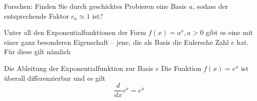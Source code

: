 \begin{enumerate}
          Forschen: Finden Sie durch geschicktes Probieren eine Basis $a$, sodass der entsprechende Faktor $c_a \approx 1$ ist?

\end{enumerate}
\clearpage
Unter all den Exponentialfunktionen der Form $f(x)=a^x,a>0$ gibt es eine mit einer ganz besonderen Eigenschaft – jene, die als Basis die Eulersche Zahl $e$ hat. Für diese gilt nämlich

\begin{theo}
    {Die Ableitung der Exponentialfunktion zur Basis $e$}{}
    Die Funktion $f(x)=e^x$ ist überall differenzierbar und es gilt
    $$
        \frac{d}{dx} e^x = e^x
    $$
\end{theo}

